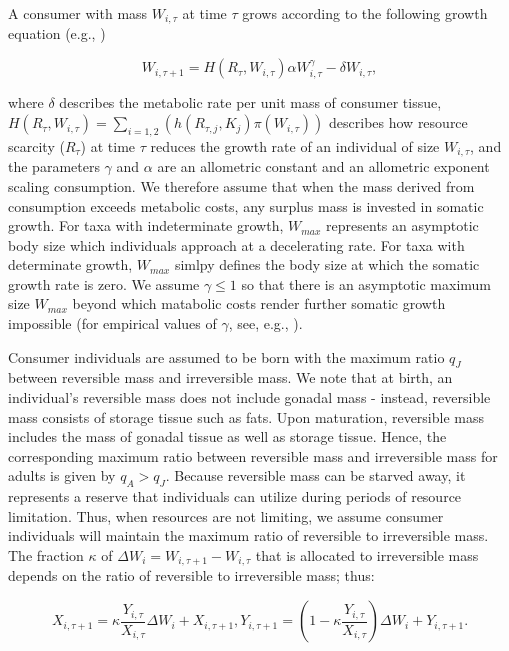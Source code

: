\documentclass[11pt]{article}
\begin{document}
\begin{linenumbers}
A consumer with mass $W_{i,\tau}$ at time $\tau$ grows according to the following growth equation (e.g., \citealt{west01})
\begin{linenomath}
\begin{equation}
\label{eqn:growth1}
W_{i,\tau+1} = H(R_{\tau}, W_{i,\tau}) \alpha W_{i,\tau}^{\gamma}  - \delta W_{i,\tau},
\end{equation}
\end{linenomath}
where $\delta$ describes the metabolic rate per unit mass of consumer tissue, $H(R_{\tau}, W_{i,\tau}) = \sum_{i=1,2} (h(R_{\tau,j}, K_j) \pi(W_{i,\tau}))$ describes how resource scarcity ($R_{\tau}$) at time $\tau$ reduces the growth rate of an individual of size $W_{i,\tau}$, and the parameters $\gamma$ and $\alpha$ are an allometric constant and an allometric exponent scaling consumption. We therefore assume that when the mass derived from consumption exceeds metabolic costs, any surplus mass is invested in somatic growth. For taxa with indeterminate growth, $W_{max}$ represents an asymptotic body size which individuals approach at a decelerating rate. For taxa with determinate growth, $W_{max}$ simlpy defines the body size at which the somatic growth rate is zero. We assume $\gamma \leq 1 $ so that there is an asymptotic maximum size $W_{max}$ beyond which matabolic costs render further somatic growth impossible (for empirical values of $\gamma$, see, e.g., \citealt{moses08}).

Consumer individuals are assumed to be born with the maximum ratio $q_J$ between reversible mass and irreversible mass. We note that at birth, an individual's reversible mass does not include gonadal mass - instead, reversible mass consists of storage tissue such as fats. Upon maturation, reversible mass includes the mass of gonadal tissue as well as storage tissue. Hence, the corresponding maximum ratio between reversible mass and irreversible mass for adults is given by $q_A > q_J$. Because reversible mass can be starved away, it represents a reserve that individuals can utilize during periods of resource limitation. Thus, when resources are not limiting, we assume consumer individuals will maintain the maximum ratio of reversible to irreversible mass. The fraction $\kappa$ of $ \Delta W_i = W_{i,\tau+1} - W_{i,\tau}$ that is allocated to irreversible mass depends on the ratio of reversible to irreversible mass; thus:
\begin{linenomath}
\begin{equation}
\label{eqn:growth1}
X_{i,\tau+1} = \kappa \frac{Y_{i,\tau}}{X_{i,\tau}} \Delta W_i + X_{i,\tau+1},
Y_{i,\tau+1} = (1-\kappa \frac{Y_{i,\tau}}{X_{i,\tau}}) \Delta W_i + Y_{i,\tau+1}.
\end{equation}
\end{linenomath}


\end{linenumbers}
\end{document}
